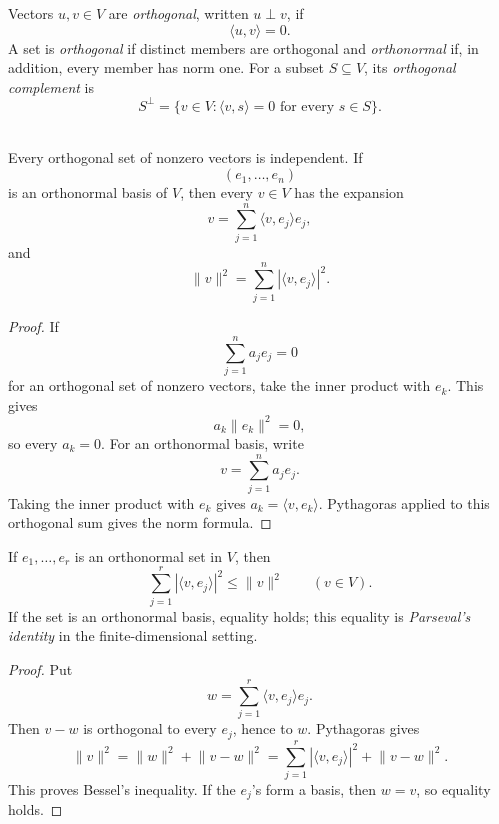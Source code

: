 \begin{definition}
Vectors \(u,v\in V\) are \emph{orthogonal}, written \(u\perp v\), if
\[
\langle u,v\rangle=0.
\]
A set is \emph{orthogonal} if distinct members are orthogonal and
\emph{orthonormal} if, in addition, every member has norm one. For a subset
\(S\subseteq V\), its \emph{orthogonal complement} is
\[
S^\perp=\{v\in V:\langle v,s\rangle=0\text{ for every }s\in S\}.
\]
\end{definition}

\begin{proposition}\leavevmode\\
Every orthogonal set of nonzero vectors is independent. If
\[
(e_1,\ldots,e_n)
\]
is an orthonormal basis of \(V\), then every \(v\in V\) has the expansion
\[
v=\sum_{j=1}^n\langle v,e_j\rangle e_j,
\]
and
\[
\lVert v\rVert^2=\sum_{j=1}^n|\langle v,e_j\rangle|^2.
\]
\end{proposition}
\begin{proof}
If
\[
\sum_{j=1}^na_je_j=0
\]
for an orthogonal set of nonzero vectors, take the inner product with
\(e_k\). This gives
\[
a_k\lVert e_k\rVert^2=0,
\]
so every \(a_k=0\). For an orthonormal basis, write
\[
v=\sum_{j=1}^na_je_j.
\]
Taking the inner product with \(e_k\) gives \(a_k=\langle v,e_k\rangle\).
Pythagoras applied to this orthogonal sum gives the norm formula.
\end{proof}

\begin{corollary}
If \(e_1,\ldots,e_r\) is an orthonormal set in \(V\), then
\[
\sum_{j=1}^r|\langle v,e_j\rangle|^2\leq\lVert v\rVert^2
\qquad(v\in V).
\]
If the set is an orthonormal basis, equality holds; this equality is
\emph{Parseval's identity} in the finite-dimensional setting.
\end{corollary}
\begin{proof}
Put
\[
w=\sum_{j=1}^r\langle v,e_j\rangle e_j.
\]
Then \(v-w\) is orthogonal to every \(e_j\), hence to \(w\). Pythagoras
gives
\[
\lVert v\rVert^2=\lVert w\rVert^2+\lVert v-w\rVert^2
=\sum_{j=1}^r|\langle v,e_j\rangle|^2+\lVert v-w\rVert^2.
\]
This proves Bessel's inequality. If the \(e_j\)'s form a basis, then
\(w=v\), so equality holds.
\end{proof}

